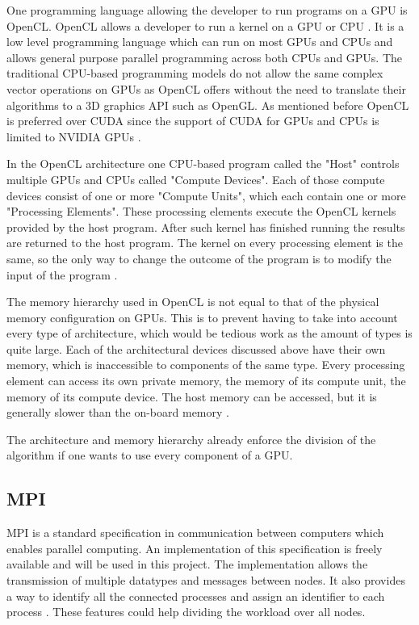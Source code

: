 \documentclass{sig-alternate-br}
\begin{document}
One programming language allowing the developer to run programs on a GPU is OpenCL.
OpenCL allows a developer to run a kernel on a GPU or CPU \cite{OpenCL}.
It is a low level programming language which can run on most GPUs and CPUs and allows general purpose parallel programming across both CPUs and GPUs.
The traditional CPU-based programming models do not allow the same complex vector operations on GPUs as OpenCL offers without the need to translate their algorithms to a 3D graphics API such as OpenGL.
As mentioned before OpenCL is preferred over CUDA since the support of CUDA for GPUs and CPUs is limited to NVIDIA GPUs \cite{CUDA}.

In the OpenCL architecture one CPU-based program called the "Host" controls multiple GPUs and CPUs called "Compute Devices".
Each of those compute devices consist of one or more "Compute Units", which each contain one or more "Processing Elements".
These processing elements execute the OpenCL kernels provided by the host program.
After such kernel has finished running the results are returned to the host program.
The kernel on every processing element is the same, so the only way to change the outcome of the program is to modify the input of the program \cite{OpenCL}.

The memory hierarchy used in OpenCL is not equal to that of the physical memory configuration on GPUs.
This is to prevent having to take into account every type of architecture, which would be tedious work as the amount of types is quite large.
Each of the architectural devices discussed above have their own memory, which is inaccessible to components of the same type.
Every processing element can access its own private memory, the memory of its compute unit, the memory of its compute device.
The host memory can be accessed, but it is generally slower than the on-board memory \cite{OpenCL}.

The architecture and memory hierarchy already enforce the division of the algorithm if one wants to use every component of a GPU.

\subsection{MPI}
MPI is a standard specification in communication between computers which enables parallel computing.
An implementation of this specification is freely available and will be used in this project.
The implementation allows the transmission of multiple datatypes and messages between nodes.
It also provides a way to identify all the connected processes and assign an identifier to each process \cite{MPI}.
These features could help dividing the workload over all nodes.
\end{document}
